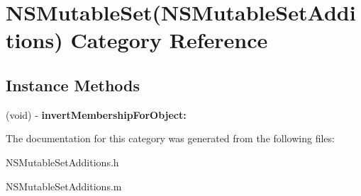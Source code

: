 \hypertarget{category_n_s_mutable_set_07_n_s_mutable_set_additions_08}{}\section{N\+S\+Mutable\+Set(N\+S\+Mutable\+Set\+Additions) Category Reference}
\label{category_n_s_mutable_set_07_n_s_mutable_set_additions_08}
\subsection*{Instance Methods}
\begin{DoxyCompactItemize}
\item 
\mbox{\label{category_n_s_mutable_set_07_n_s_mutable_set_additions_08_a168975901f81a420260fd8395012b2cc}} 
(void) -\/ {\bfseries invert\+Membership\+For\+Object\+:}
\end{DoxyCompactItemize}


The documentation for this category was generated from the following files\+:\begin{DoxyCompactItemize}
\item 
N\+S\+Mutable\+Set\+Additions.\+h\item 
N\+S\+Mutable\+Set\+Additions.\+m\end{DoxyCompactItemize}
